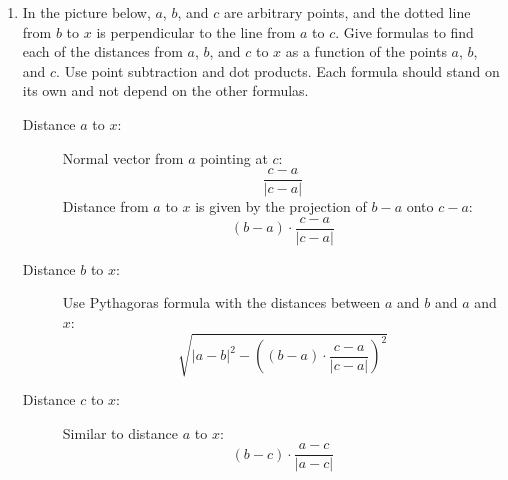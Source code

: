 \documentclass{article}
\begin{document}

\begin{enumerate}

\item
  In the picture below, $a$, $b$, and $c$ are arbitrary points, and
  the dotted line from $b$ to $x$ is perpendicular to the line from
  $a$ to $c$.  Give formulas to find each of the
  distances from 
  $a$, $b$, and $c$ to $x$ as a function of the points $a$, $b$, and $c$.
  Use point subtraction and dot products.  Each formula should stand
  on its own and not depend on the other formulas.

\newcommand{\mypoint}[3] {
  \node (#1) at (#2) {};
  \fill (#2) circle (2pt);
  \node[anchor=#3] (label#1) at (#2) {$#1$};
  }

\begin{description}
\item[Distance $a$ to $x$:]
  Normal vector from $a$ pointing at $c$:
  \[ \frac{c-a}{|c-a|} \]
  Distance from $a$ to $x$ is given by the projection of $b-a$
  onto $c-a$: \[ (b-a) \cdot \frac{c-a}{|c-a|} \]

\item[Distance $b$ to $x$:] Use Pythagoras formula with the distances
  between $a$ and $b$ and $a$ and $x$:
  \[
  \sqrt{|a-b|^2 - \left((b-a) \cdot \frac{c-a}{|c-a|} \right)^2}
  \]

  

\item[Distance $c$ to $x$:]
  Similar to distance $a$ to $x$:
  \[ (b-c) \cdot \frac{a-c}{|a-c|} \]
 
  
\end{description}




\end{enumerate}
\end{document}
